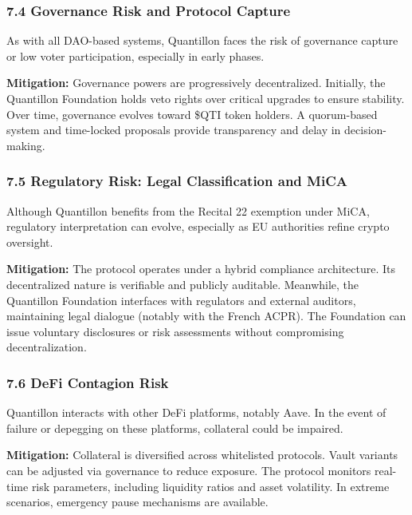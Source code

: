 \hypertarget{governance-risk-and-protocol-capture}{%
\subsubsection{7.4 Governance Risk and Protocol
Capture}\label{governance-risk-and-protocol-capture}}

As with all DAO-based systems, Quantillon faces the risk of governance
capture or low voter participation, especially in early phases.

\textbf{Mitigation:} Governance powers are progressively decentralized.
Initially, the Quantillon Foundation holds veto rights over critical
upgrades to ensure stability. Over time, governance evolves toward \$QTI
token holders. A quorum-based system and time-locked proposals provide
transparency and delay in decision-making.

\hypertarget{regulatory-risk-legal-classification-and-mica}{%
\subsubsection{7.5 Regulatory Risk: Legal Classification and
MiCA}\label{regulatory-risk-legal-classification-and-mica}}

Although Quantillon benefits from the Recital 22 exemption under MiCA,
regulatory interpretation can evolve, especially as EU authorities
refine crypto oversight.

\textbf{Mitigation:} The protocol operates under a hybrid compliance
architecture. Its decentralized nature is verifiable and publicly
auditable. Meanwhile, the Quantillon Foundation interfaces with
regulators and external auditors, maintaining legal dialogue (notably
with the French ACPR). The Foundation can issue voluntary disclosures or
risk assessments without compromising decentralization.

\hypertarget{defi-contagion-risk}{%
\subsubsection{7.6 DeFi Contagion Risk}\label{defi-contagion-risk}}

Quantillon interacts with other DeFi platforms, notably Aave. In the
event of failure or depegging on these platforms, collateral could be
impaired.

\textbf{Mitigation:} Collateral is diversified across whitelisted
protocols. Vault variants can be adjusted via governance to reduce
exposure. The protocol monitors real-time risk parameters, including
liquidity ratios and asset volatility. In extreme scenarios, emergency
pause mechanisms are available.

